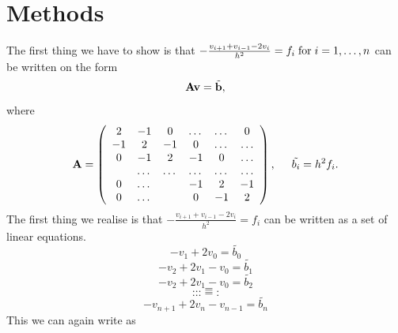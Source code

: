 \documentclass[12pt,a4wide]{article}
\begin{document}
\section*{Methods}
The first thing we have to show is that 
   $-\frac{v_{i+1}+v_{i-1}-2v_i}{h^2} = f_i \hspace{0.1cm} \mathrm{for} \hspace{0.1cm} i=1,\dots, n$
can be written on the form
\[
   {\bf A}{\bf v} = \tilde{{\bf b}},
\]
where
\begin{equation}
    {\bf A} = \left(\begin{array}{cccccc}
                           2& -1& 0 &\dots   & \dots &0 \\
                           -1 & 2 & -1 &0 &\dots &\dots \\
                           0&-1 &2 & -1 & 0 & \dots \\
                           & \dots   & \dots &\dots   &\dots & \dots \\
                           0&\dots   &  &-1 &2& -1 \\
                           0&\dots    &  & 0  &-1 & 2 \\
                      \end{array} \right),
	      \hspace{0.5cm}             	\tilde{{b_i}} = {h^2}{f_i}.
\end{equation}
The first thing we realise is that  $-\frac{v_{i+1}+v_{i-1}-2v_i}{h^2} = f_i$ can be written as a set of linear equations.
\[
-{v_{1}}+2{v_{0}} = \tilde{b_{0}} 
\]
\[
-{v_2} + 2{v_1} - {v_0} = \tilde{b_1} 
\]
\[
-{v_2} + 2{v_1} - {v_0} = \tilde{b_2} 
\]
\[
\dots = .
\]
\[
\dots = .
\]
\[
-{v_{n+1}} + 2{v_n} - {v_{n-1}} = \tilde{b_n}
\]
This we can again write as 
\end{document}
